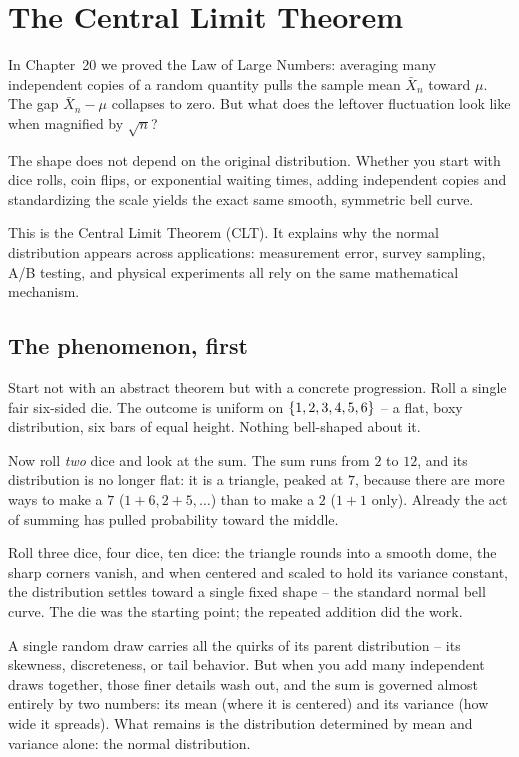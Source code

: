 \chapter{The Central Limit Theorem}

In Chapter~20 we proved the Law of Large Numbers: averaging many independent
copies of a random quantity pulls the sample mean $\bar X_n$ toward $\mu$.
The gap $\bar X_n - \mu$ collapses to zero. But what does the leftover
fluctuation look like when magnified by $\sqrt{n}$?

The shape does not depend on the original distribution. Whether you
start with dice rolls, coin flips, or exponential waiting times, adding
independent copies and standardizing the scale yields the exact same smooth,
symmetric bell curve.

This is the Central Limit Theorem (CLT). It explains why the normal distribution appears across applications: measurement error,
survey sampling, A/B testing, and physical experiments all rely on the same mathematical mechanism.

\chapterline

\section{The phenomenon, first}
\label{ch21:phenomenon}

Start not with an abstract theorem but with a concrete progression. Roll a single fair
six-sided die. The outcome is uniform on $\{1,2,3,4,5,6\}$ -- a flat, boxy
distribution, six bars of equal height. Nothing bell-shaped about it.

Now roll \emph{two} dice and look at the sum. The sum runs from $2$ to $12$, and its
distribution is no longer flat: it is a triangle, peaked at $7$, because there are more
ways to make a $7$ ($1{+}6, 2{+}5, \dots$) than to make a $2$ ($1{+}1$ only). Already
the act of summing has pulled probability toward the middle.

Roll three dice, four dice, ten dice: the triangle rounds into a smooth dome, the
sharp corners vanish, and when centered and scaled to hold its variance constant, the
distribution settles toward a single fixed shape -- the standard normal bell curve.
The die was the starting point; the repeated addition did the work.

\begin{intuitionbox}
A single random draw carries all the quirks of its parent distribution -- its skewness,
discreteness, or tail behavior. But when you add many independent draws together, those
finer details wash out, and the sum is governed almost entirely by two numbers: its
mean (where it is centered) and its variance (how wide it spreads). What remains is the
distribution determined by mean and variance alone: the normal distribution.
\end{intuitionbox}

